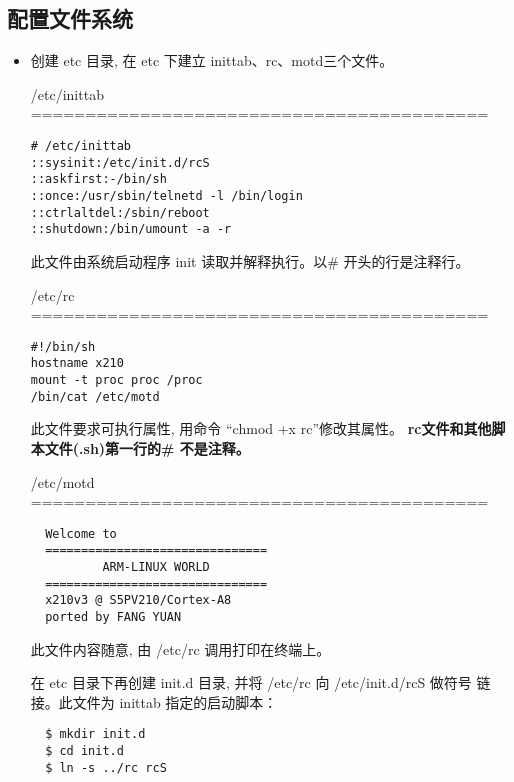 \subsection{配置文件系统}
\begin{itemize}\itemsep=-3pt
  \item 创建 etc 目录, 在 etc 下建立 inittab、rc、motd三个文件。

	/etc/inittab \\ ==========================================

\begin{boxedminipage}{.9\textwidth}
\begin{verbatim}
# /etc/inittab
::sysinit:/etc/init.d/rcS
::askfirst:-/bin/sh
::once:/usr/sbin/telnetd -l /bin/login
::ctrlaltdel:/sbin/reboot
::shutdown:/bin/umount -a -r
\end{verbatim}
\end{boxedminipage}

	此文件由系统启动程序 init 读取并解释执行。以\# 开头的行是注释行。

	/etc/rc \\ ==========================================

\begin{boxedminipage}{.9\textwidth}
\begin{verbatim}
#!/bin/sh
hostname x210
mount -t proc proc /proc
/bin/cat /etc/motd
\end{verbatim}
\end{boxedminipage}

	此文件要求可执行属性, 用命令 ``chmod +x rc''修改其属性。
{\bf rc文件和其他脚本文件(.sh)第一行的\# 不是注释。}

	/etc/motd \\ ==========================================

\begin{boxedminipage}{.9\textwidth}
\begin{verbatim}
  Welcome to
  ===============================
          ARM-LINUX WORLD
  ===============================
  x210v3 @ S5PV210/Cortex-A8
  ported by FANG YUAN
\end{verbatim}
\end{boxedminipage}

	此文件内容随意, 由 /etc/rc 调用打印在终端上。

	在 etc 目录下再创建 init.d 目录, 并将 /etc/rc 向 /etc/init.d/rcS 做符号
链接。此文件为 inittab 指定的启动脚本：

\begin{boxedminipage}{.9\textwidth}
\begin{verbatim}
  $ mkdir init.d
  $ cd init.d
  $ ln -s ../rc rcS
\end{verbatim}
\end{boxedminipage}


\end{itemize}
